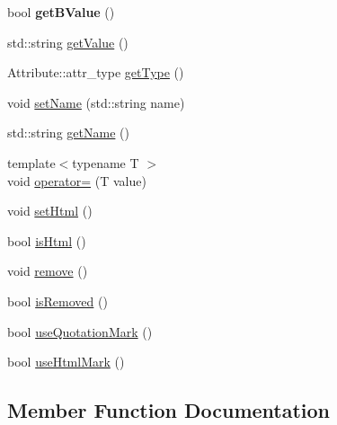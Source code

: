 \begin{DoxyCompactItemize}
\item 
bool {\bfseries get\+B\+Value} ()\hypertarget{classmemgraph_1_1_attribute_a0c340cb767ce09e67939580b5130c034}{}\label{classmemgraph_1_1_attribute_a0c340cb767ce09e67939580b5130c034}

\item 
std\+::string \hyperlink{classmemgraph_1_1_attribute_a0b28ae26144cb29b9949d3aadb00012c}{get\+Value} ()
\item 
Attribute\+::attr\+\_\+type \hyperlink{classmemgraph_1_1_attribute_a80c4a4ff89eac0701b6ca3d2fd7de25a}{get\+Type} ()
\item 
void \hyperlink{classmemgraph_1_1_attribute_ad80f103d018954e2649357a24ed41474}{set\+Name} (std\+::string name)
\item 
std\+::string \hyperlink{classmemgraph_1_1_attribute_aea6cb4cc8249e471dc1f78d35de179b9}{get\+Name} ()
\item 
{\footnotesize template$<$typename T $>$ }\\void \hyperlink{classmemgraph_1_1_attribute_a944b75ff0c9154173b676dd012e705a7}{operator=} (T value)
\item 
void \hyperlink{classmemgraph_1_1_attribute_afd60d5baa243366c57e0492a52bff537}{set\+Html} ()
\item 
bool \hyperlink{classmemgraph_1_1_attribute_a740bf0856283ba8109627e661148505f}{is\+Html} ()
\item 
void \hyperlink{classmemgraph_1_1_attribute_a2bb7f68f1a0ce57d3aab06c1439595ae}{remove} ()
\item 
bool \hyperlink{classmemgraph_1_1_attribute_ae581416c87c6f4a0d603fcf015c08a21}{is\+Removed} ()
\item 
bool \hyperlink{classmemgraph_1_1_attribute_a357a62553f6d5e9dff3b56cb9db9c3e0}{use\+Quotation\+Mark} ()
\item 
bool \hyperlink{classmemgraph_1_1_attribute_a2f1b1f5ed587ba154b4e2b5766301d64}{use\+Html\+Mark} ()
\end{DoxyCompactItemize}


\subsection{Member Function Documentation}
